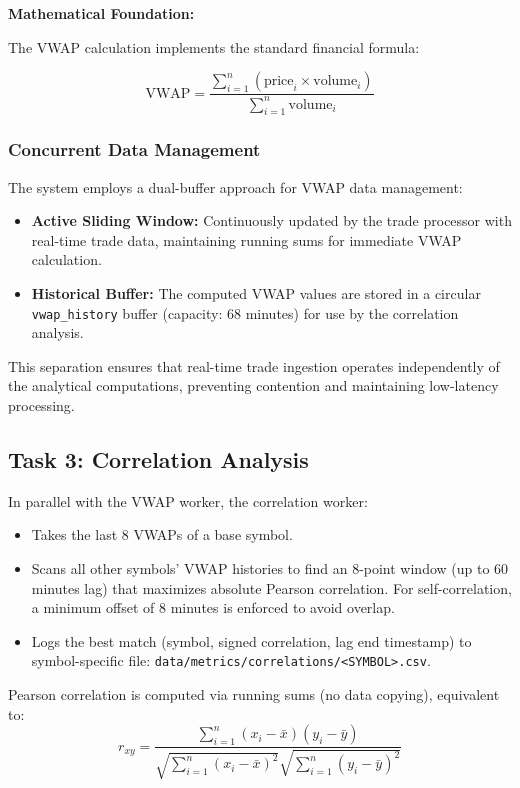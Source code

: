 \documentclass[12pt,a4paper]{article}
\begin{document}
\textbf{Mathematical Foundation:}

The VWAP calculation implements the standard financial formula:

\[
\mathrm{VWAP} = \frac{\sum_{i=1}^{n} (\text{price}_i \times \text{volume}_i)}{\sum_{i=1}^{n} \text{volume}_i}
\]


\subsubsection*{Concurrent Data Management}

The system employs a dual-buffer approach for VWAP data management:

\begin{itemize}
    \item \textbf{Active Sliding Window:} Continuously updated by the trade processor with real-time trade data, maintaining running sums for immediate VWAP calculation.
    \item \textbf{Historical Buffer:} The computed VWAP values are stored in a circular \texttt{vwap\_history} buffer (capacity: 68 minutes) for use by the correlation analysis.
\end{itemize}

This separation ensures that real-time trade ingestion operates independently of the analytical computations, preventing contention and maintaining low-latency processing.


\subsection{Task 3: Correlation Analysis}
In parallel with the VWAP worker, the correlation worker:
\begin{itemize}
    \item Takes the last 8 VWAPs of a base symbol.
    \item Scans all other symbols’ VWAP histories to find an 8-point window (up to 60 minutes lag) that maximizes absolute Pearson correlation. For self-correlation, a minimum offset of 8 minutes is enforced to avoid overlap.
    \item Logs the best match (symbol, signed correlation, lag end timestamp) to symbol-specific file: \texttt{data/metrics/correlations/<SYMBOL>.csv}.
\end{itemize}

Pearson correlation is computed via running sums (no data copying), equivalent to:
\[
r_{xy} = \frac{\sum_{i=1}^n (x_i - \bar{x})(y_i - \bar{y})}{\sqrt{\sum_{i=1}^n (x_i - \bar{x})^2} \sqrt{\sum_{i=1}^n (y_i - \bar{y})^2}}
\]
\end{document}
